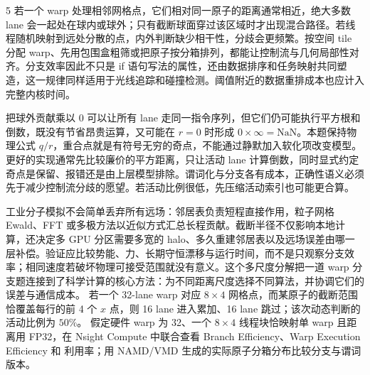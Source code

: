 \begin{solutionexercise}{5}
若一个 warp 处理相邻网格点，它们相对同一原子的距离通常相近，绝大多数 lane 会一起处在球内或球外；只有截断球面穿过该区域时才出现混合路径。若线程随机映射到远处分散的点，内外判断缺少相干性，分歧会更频繁。按空间 tile 分配 warp、先用包围盒粗筛或把原子按分箱排列，都能让控制流与几何局部性对齐。分支效率因此不只是 if 语句写法的属性，还由数据排序和任务映射共同塑造，这一规律同样适用于光线追踪和碰撞检测。阈值附近的数据重排成本也应计入完整内核时间。

把球外贡献乘以 0 可以让所有 lane 走同一指令序列，但它们仍可能执行平方根和倒数，既没有节省昂贵运算，又可能在 $r=0$ 时形成 $0\times\infty=\mathrm{NaN}$。本题保持物理公式 $q/r$，重合点就是有符号无穷的奇点，不能通过静默加入软化项改变模型。更好的实现通常先比较廉价的平方距离，只让活动 lane 计算倒数，同时显式约定奇点是保留、报错还是由上层模型排除。谓词化与分支各有成本，正确性语义必须先于减少控制流分歧的愿望。若活动比例很低，先压缩活动索引也可能更合算。

工业分子模拟不会简单丢弃所有远场：邻居表负责短程直接作用，粒子网格 Ewald、FFT 或多极方法以近似方式汇总长程贡献。截断半径不仅影响本地计算，还决定多 GPU 分区需要多宽的 halo、多久重建邻居表以及远场误差由哪一层补偿。验证应比较势能、力、长期守恒漂移与运行时间，而不是只观察分支效率；相同速度若破坏物理可接受范围就没有意义。这个多尺度分解把一道 warp 分支题连接到了科学计算的核心方法：为不同距离尺度选择不同算法，并协调它们的误差与通信成本。
\variantheading 若一个 32-lane warp 对应 $8\times4$ 网格点，而某原子的截断范围恰覆盖每行的前 4 个 $x$ 点，则 16 lane 进入累加、16 lane 跳过；该次动态判断的活动比例为 $50\%$。
\practiceheading 假定硬件 warp 为 32、一个 $8\times4$ 线程块恰映射单 warp 且距离用 FP32，在 Nsight Compute 中联合查看 Branch Efficiency、Warp Execution Efficiency 和  利用率；用 NAMD/VMD 生成的实际原子分箱分布比较分支与谓词版本。
\end{solutionexercise}
